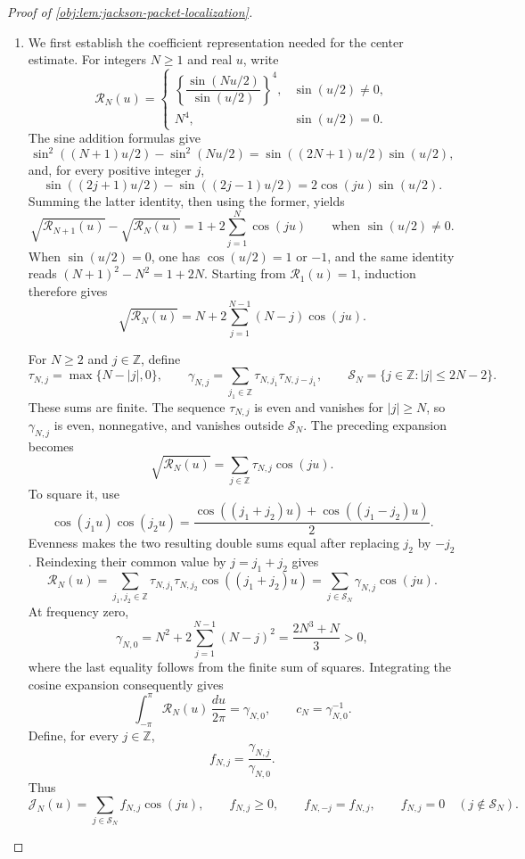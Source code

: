 \documentclass[11pt]{article}
\begin{document}
\begin{proof}[Proof of \cref{obj:lem:jackson-packet-localization}]
\begin{enumerate}
\item We first establish the coefficient representation needed for the center estimate. For integers \(N\geq1\) and real \(u\), write
\[
\mathcal R_N(u)=
\begin{cases}
\left\{\dfrac{\sin(Nu/2)}{\sin(u/2)}\right\}^{4},
& \sin(u/2)\neq0,\\[1ex]
N^4,&\sin(u/2)=0.
\end{cases}
\]
The sine addition formulas give
\[
\sin^2((N+1)u/2)-\sin^2(Nu/2)
=\sin((2N+1)u/2)\sin(u/2),
\]
and, for every positive integer \(j\),
\[
\sin((2j+1)u/2)-\sin((2j-1)u/2)
=2\cos(ju)\sin(u/2).
\]
Summing the latter identity, then using the former, yields
\[
\sqrt{\mathcal R_{N+1}(u)}-\sqrt{\mathcal R_N(u)}
=1+2\sum_{j=1}^{N}\cos(ju)
\qquad\text{when }\sin(u/2)\neq0.
\]
When \(\sin(u/2)=0\), one has \(\cos(u/2)=1\) or \(-1\), and the same identity reads
\((N+1)^2-N^2=1+2N\). Starting from \(\mathcal R_1(u)=1\), induction therefore gives
\[
\sqrt{\mathcal R_N(u)}
=N+2\sum_{j=1}^{N-1}(N-j)\cos(ju).
\]

For \(N\geq2\) and \(j\in\mathbb Z\), define
\[
\tau_{N,j}=\max\{N-|j|,0\},\qquad
\gamma_{N,j}=\sum_{j_1\in\mathbb Z}
\tau_{N,j_1}\tau_{N,j-j_1},\qquad
\mathcal S_N=\{j\in\mathbb Z:|j|\leq2N-2\}.
\]
These sums are finite. The sequence \(\tau_{N,j}\) is even and vanishes for
\(|j|\geq N\), so \(\gamma_{N,j}\) is even, nonnegative, and vanishes outside
\(\mathcal S_N\). The preceding expansion becomes
\[
\sqrt{\mathcal R_N(u)}
=\sum_{j\in\mathbb Z}\tau_{N,j}\cos(ju).
\]
To square it, use
\[
\cos(j_1u)\cos(j_2u)
=\frac{\cos((j_1+j_2)u)+\cos((j_1-j_2)u)}2.
\]
Evenness makes the two resulting double sums equal after replacing
\(j_2\) by \(-j_2\). Reindexing their common value by \(j=j_1+j_2\) gives
\[
\mathcal R_N(u)
=\sum_{j_1,j_2\in\mathbb Z}
\tau_{N,j_1}\tau_{N,j_2}\cos((j_1+j_2)u)
=\sum_{j\in\mathcal S_N}\gamma_{N,j}\cos(ju).
\]
At frequency zero,
\[
\gamma_{N,0}
=N^2+2\sum_{j=1}^{N-1}(N-j)^2
=\frac{2N^3+N}{3}>0,
\]
where the last equality follows from the finite sum of squares. Integrating the cosine expansion consequently gives
\[
\int_{-\pi}^{\pi}\mathcal R_N(u)\,\frac{du}{2\pi}
=\gamma_{N,0},
\qquad
c_N=\gamma_{N,0}^{-1}.
\]
Define, for every \(j\in\mathbb Z\),
\[
f_{N,j}=\frac{\gamma_{N,j}}{\gamma_{N,0}}.
\]
Thus
\[
\mathcal J_N(u)=\sum_{j\in\mathcal S_N}f_{N,j}\cos(ju),
\qquad
f_{N,j}\geq0,\qquad
f_{N,-j}=f_{N,j},\qquad
f_{N,j}=0\quad(j\notin\mathcal S_N).
\]


\end{enumerate}
\end{proof}
\end{document}
